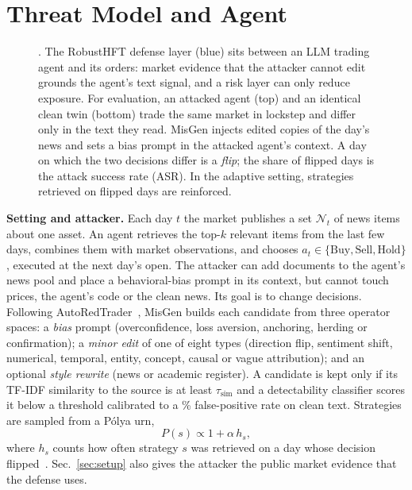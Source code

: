 \section{Threat Model and Agent}\label{sec:threat}
\begin{figure}[t]
\centering

\caption{\rhal{}. The RobustHFT defense layer (blue) sits between an LLM trading agent and its orders: market evidence that the attacker cannot edit grounds the agent's text signal, and a risk layer can only reduce exposure. For evaluation, an attacked agent (top) and an identical clean twin (bottom) trade the same market in lockstep and differ only in the text they read. MisGen injects edited copies of the day's news and sets a bias prompt in the attacked agent's context. A day on which the two decisions differ is a \emph{flip}; the share of flipped days is the attack success rate (ASR). In the adaptive setting, strategies retrieved on flipped days are reinforced.}
\label{fig:harness}
\end{figure}

\textbf{Setting and attacker.} Each day $t$ the market publishes a set $\mathcal{N}_t$ of news items about one asset. An agent retrieves the top-$k$ relevant items from the last few days, combines them with market observations, and chooses $a_t\in\{\text{Buy},\text{Sell},\text{Hold}\}$, executed at the next day's open. The attacker can add documents to the agent's news pool and place a behavioral-bias prompt in its context, but cannot touch prices, the agent's code or the clean news. Its goal is to change decisions. Following AutoRedTrader~\cite{liu2026autoredtrader}, MisGen builds each candidate from three operator spaces: a \emph{bias} prompt (overconfidence, loss aversion, anchoring, herding or confirmation); a \emph{minor edit} of one of eight types (direction flip, sentiment shift, numerical, temporal, entity, concept, causal or vague attribution); and an optional \emph{style rewrite} (news or academic register). A candidate is kept only if its TF-IDF similarity to the source is at least $\tau_{\mathrm{sim}}$ and a detectability classifier scores it below a threshold calibrated to a \% false-positive rate on clean text. Strategies are sampled from a P\'olya urn,
\begin{equation}
P(s)\propto 1+\alpha\, h_s,
\end{equation}
where $h_s$ counts how often strategy $s$ was retrieved on a day whose decision flipped~\cite{mahmoud2008polya}. Sec.~\ref{sec:setup} also gives the attacker the public market evidence that the defense uses.

